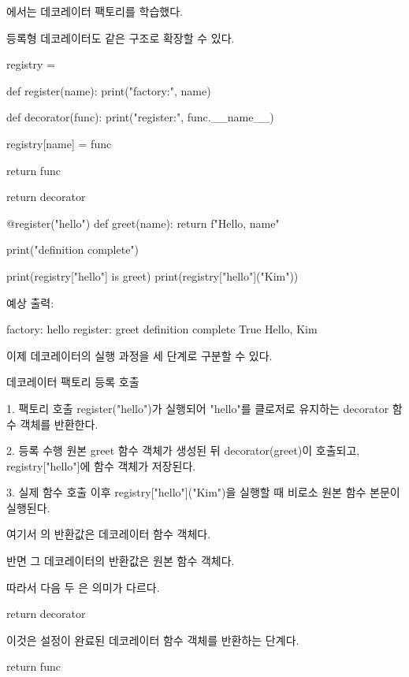 에서는 데코레이터 팩토리를 학습했다.

등록형 데코레이터도 같은 구조로 확장할 수 있다.

\begin{dhkcode}
registry = {}


def register(name):
    print("factory:", name)

    def decorator(func):
        print("register:", func.__name__)

        registry[name] = func

        return func

    return decorator


@register("hello")
def greet(name):
    return f"Hello, {name}"


print("definition complete")

print(registry["hello"] is greet)
print(registry["hello"]("Kim"))
\end{dhkcode}

예상 출력:

\begin{dhkzsh}
factory: hello
register: greet
definition complete
True
Hello, Kim
\end{dhkzsh}

이제 데코레이터의 실행 과정을 세 단계로 구분할 수 있다.

\begin{dhksmry}
데코레이터 팩토리 \ra 등록 \ra 호출

1. 팩토리 호출
   register("hello")가 실행되어 "hello"를 클로저로 유지하는
   decorator 함수 객체를 반환한다.

2. 등록 수행
   원본 greet 함수 객체가 생성된 뒤 decorator(greet)이 호출되고,
   registry["hello"]에 함수 객체가 저장된다.

3. 실제 함수 호출
   이후 registry["hello"]("Kim")을 실행할 때 비로소 원본 함수
   본문이 실행된다.
\end{dhksmry}

여기서 의 반환값은 데코레이터 함수 객체다.

반면 그 데코레이터의 반환값은 원본  함수 객체다.

따라서 다음 두 은 의미가 다르다.

\begin{dhkcode}
return decorator
\end{dhkcode}

이것은 설정이 완료된 데코레이터 함수 객체를 반환하는 단계다.

\begin{dhkcode}
return func
\end{dhkcode}

